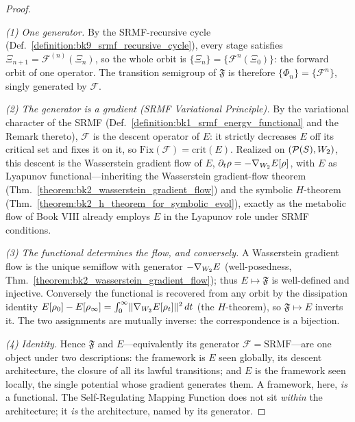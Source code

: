 \begin{proof}
\label{proof:bk9_framework_functional_identity}
\leavevmode

\emph{(1) One generator.} By the SRMF-recursive cycle (Def.~\ref{definition:bk9_srmf_recursive_cycle}), every stage satisfies $\Xi_{n+1} = \mathcal{F}^{(n)}(\Xi_n)$, so the whole orbit is $\{\Xi_n\} = \{\mathcal{F}^{n}(\Xi_0)\}$: the forward orbit of one operator. The transition semigroup of $\mathfrak{F}$ is therefore $\{\Phi_n\} = \{\mathcal{F}^{n}\}$, singly generated by $\mathcal{F}$.

\emph{(2) The generator is a gradient (SRMF Variational Principle).} By the variational character of the SRMF (Def.~\ref{definition:bk1_srmf_energy_functional} and the Remark thereto), $\mathcal{F}$ is the descent operator of $E$: it strictly decreases $E$ off its critical set and fixes it on it, so $\mathrm{Fix}(\mathcal{F}) = \mathrm{crit}(E)$. Realized on $(\mathcal{P}(S),W_2)$, this descent is the Wasserstein gradient flow of $E$, $\partial_t \rho = -\nabla_{W_2} E[\rho]$, with $E$ as Lyapunov functional---inheriting the Wasserstein gradient-flow theorem (Thm.~\ref{theorem:bk2_wasserstein_gradient_flow}) and the symbolic $H$-theorem (Thm.~\ref{theorem:bk2_h_theorem_for_symbolic_evol}), exactly as the metabolic flow of Book VIII already employs $E$ in the Lyapunov role under SRMF conditions.

\emph{(3) The functional determines the flow, and conversely.} A Wasserstein gradient flow is the unique semiflow with generator $-\nabla_{W_2} E$ (well-posedness, Thm.~\ref{theorem:bk2_wasserstein_gradient_flow}); thus $E \mapsto \mathfrak{F}$ is well-defined and injective. Conversely the functional is recovered from any orbit by the dissipation identity $E[\rho_0] - E[\rho_\infty] = \int_0^\infty \lVert \nabla_{W_2} E[\rho_t]\rVert^2\,dt$ (the $H$-theorem), so $\mathfrak{F} \mapsto E$ inverts it. The two assignments are mutually inverse: the correspondence is a bijection.

\emph{(4) Identity.} Hence $\mathfrak{F}$ and $E$---equivalently its generator $\mathcal{F} = \mathrm{SRMF}$---are one object under two descriptions: the framework is $E$ seen globally, its descent architecture, the closure of all its lawful transitions; and $E$ is the framework seen locally, the single potential whose gradient generates them. A framework, here, \emph{is} a functional. The Self-Regulating Mapping Function does not sit \emph{within} the architecture; it \emph{is} the architecture, named by its generator.
\end{proof}
